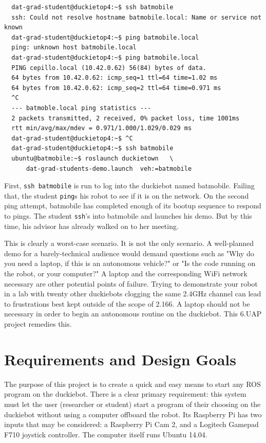 \documentclass[titlepage]{article}
\begin{document}
\begin{verbatim}
  dat-grad-student@duckietop4:~$ ssh batmobile
  ssh: Could not resolve hostname batmobile.local: Name or service not known
  dat-grad-student@duckietop4:~$ ping batmobile.local
  ping: unknown host batmobile.local
  dat-grad-student@duckietop4:~$ ping batmobile.local
  PING cepillo.local (10.42.0.62) 56(84) bytes of data.
  64 bytes from 10.42.0.62: icmp_seq=1 ttl=64 time=1.02 ms
  64 bytes from 10.42.0.62: icmp_seq=2 ttl=64 time=0.971 ms
  ^C
  --- batmoble.local ping statistics ---
  2 packets transmitted, 2 received, 0% packet loss, time 1001ms
  rtt min/avg/max/mdev = 0.971/1.000/1.029/0.029 ms
  dat-grad-student@duckietop4:~$ ^C
  dat-grad-student@duckietop4:~$ ssh batmobile
  ubuntu@batmobile:~$ roslaunch duckietown   \
      dat-grad-students-demo.launch  veh:=batmobile
 \end{verbatim}

First, \texttt{ssh batmobile} is run to log into the duckiebot named batmobile. Failing that, the student \texttt{ping}s his robot to see if it is on the network. On the second ping attempt, batmobile has completed enough of its bootup sequence to respond to pings. The student \texttt{ssh}'s into batmobile and launches his demo. But by this time, his advisor has already walked on to her meeting. 

This is clearly a worst-case scenario. It is not the only scenario.
A well-planned demo for a barely-technical audience would demand questions such as "Why do you need a laptop, if this is an autonomous vehicle?" or "Is the code running on the robot, or your computer?" A laptop and the corresponding WiFi network necessary are other potential points of failure. Trying to demonstrate your robot in a lab with twenty other duckiebots clogging the same 2.4GHz channel can lead to frustrations best kept outside of the scope of 2.166. A laptop should not be necessary in order to begin an autonomous routine on the duckiebot. This 6.UAP project remedies this. 
\section{Requirements and Design Goals}
The purpose of this project is to create a quick and easy means to start any ROS program on the duckiebot. There is a clear primary requirement: this system must let the user (researcher or student) start a program of their choosing on the duckiebot without using a computer offboard the robot. Its Raspberry Pi has two inputs that may be considered: a Raspberry Pi Cam 2, and a Logitech Gamepad F710 joystick controller. The computer itself runs Ubuntu 14.04.
\end{document}

